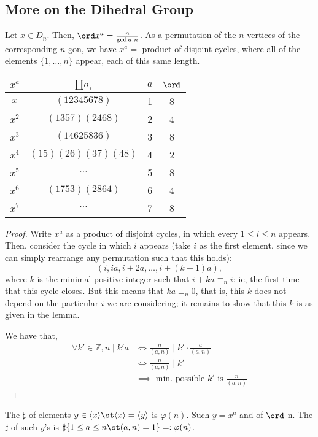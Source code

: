 \documentclass[12pt,oneside]{article}
\begin{document}
\subsection{More on the Dihedral Group}

\begin{lemma}
  Let $x \in D_n$. Then, $\ord x^a = \frac{n}{\gcd a, n}$. As a permutation of the $n$ vertices of the corresponding $n$-gon, we have $x^a = $ product of disjoint cycles, where all of the elements $\{1, \dots, n\}$ appear, each of this same length.
\end{lemma}

\begin{example}[$n=8$]
  \begin{tabular}{c|c | c | c}
    $x^a$& $\amalg\sigma_i$ & $a$ & $\ord$\\
    \hline
    $x$ & $(12345678)$ & 1 & 8\\
    $x^2$ & $(1357)(2468)$ & 2 & 4\\
    $x^3$ & $(14625836)$ & 3 & 8\\
    $x^4$ & $(15)(26)(37)(48)$ & 4 & 2\\
    $x^5$ & $\cdots$ & 5 & 8\\
    $x^6$ & $(1753)(2864)$ & 6 & 4\\
    $x^7$ & $\cdots$ & 7 & 8
  \end{tabular}
\end{example}

\begin{proof}
  Write $x^a$ as a product of disjoint cycles, in which every $1 \leq i \leq n$ appears. Then, consider the cycle in which $i$ appears (take $i$ as the first element, since we can simply rearrange any permutation such that this holds):
  \[
  (i, i a, i + 2a, \dots, i + (k-1)a),  
  \]
  where $k$ is the minimal positive integer such that $i + k a \equiv_n i$; ie, the first time that this cycle closes. But this means that $ka \equiv_n 0$, that is, this $k$ does not depend on the particular $i$ we are considering; it remains to show that this $k$ is as given in the lemma.

  We have that, \begin{align*}
    \forall k' \in \mathbb{Z}, n \mid k' a &\iff \frac{n}{(a,n)} \mid k' \cdot \frac{a}{(a, n)}\\
    &\iff \frac{n}{(a, n)} \mid k'\\
    &\implies \text{ min. possible } k' \text{ is } \frac{n}{(a,n)}
  \end{align*}
\end{proof}
\begin{corollary}
  The $\sharp$ of elements $y \in \langle x \rangle \st \langle x \rangle = \langle y \rangle$ is $\varphi (n)$. Such $y = x^a$ and of $\ord$ n. The $\sharp$ of such $y$'s is $\sharp \{1 \leq a \leq n \st (a,n) = 1\} =: \varphi (n)$.
\end{corollary}
\end{document}
